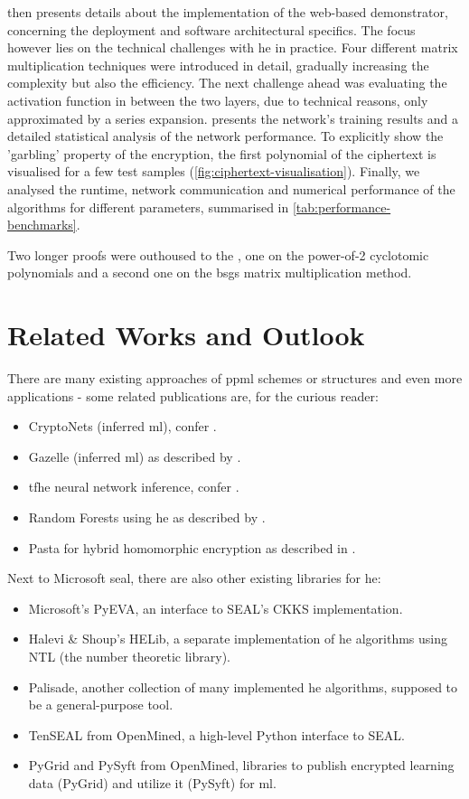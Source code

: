  then presents details about the implementation of the web-based demonstrator, concerning the deployment and software architectural specifics.
The focus however lies on the technical challenges with \glsdesc{he} in practice.
Four different matrix multiplication techniques were introduced in detail, gradually increasing the complexity but also the efficiency.
The next challenge ahead was evaluating the activation function in between the two layers, due to technical reasons, only approximated by a series expansion.
 presents the network's training results and a detailed statistical analysis of the network performance.
To explicitly show the 'garbling' property of the encryption, the first polynomial of the ciphertext is visualised for a few test samples (\cref{fig:ciphertext-visualisation}).
Finally, we analysed the runtime, network communication and numerical performance of the algorithms for different parameters, summarised in \cref{tab:performance-benchmarks}.

Two longer proofs were outhoused to the , one on the power-of-2 cyclotomic polynomials and a second one on the \gls{bsgs} matrix multiplication method.

\section{Related Works and Outlook}
There are many existing approaches of \gls{ppml} schemes or structures and even more applications - some related publications are, for the curious reader:
\begin{itemize}
  \item CryptoNets (inferred \gls{ml}), confer \cite{2016-cryptonets}.
  \item Gazelle (inferred \gls{ml}) as described by \cite{2018-gazelle}.
  \item \gls{tfhe} neural network inference, confer \cite{2019-tfhe-original}.
  \item Random Forests using \gls{he} as described by \cite{2020-cryptotree}.
  \item Pasta for hybrid homomorphic encryption as described in \cite{2021-pasta}.
\end{itemize}

Next to Microsoft \gls{seal}, there are also other existing libraries for \gls{he}:
\begin{itemize}
  \item Microsoft's PyEVA, an interface to SEAL's CKKS implementation.
  \item Halevi \& Shoup's HELib, a separate implementation of \gls{he} algorithms using NTL (the number theoretic library).
  \item Palisade, another collection of many implemented \gls{he} algorithms, supposed to be a general-purpose tool.
  \item TenSEAL from OpenMined, a high-level Python interface to SEAL.
  \item PyGrid and PySyft from OpenMined, libraries to publish encrypted learning data (PyGrid) and utilize it (PySyft) for \gls{ml}.
\end{itemize}

